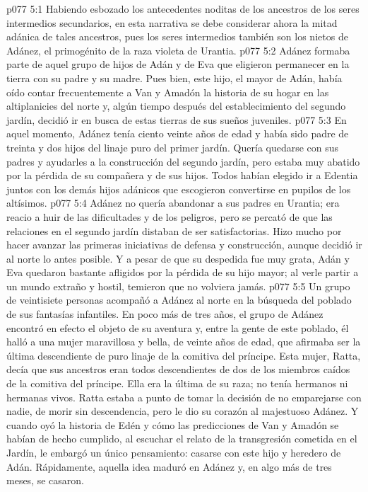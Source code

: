 \vs p077 5:1 Habiendo esbozado los antecedentes noditas de los ancestros de los seres intermedios secundarios, en esta narrativa se debe considerar ahora la mitad adánica de tales ancestros, pues los seres intermedios también son los nietos de Adánez, el primogénito de la raza violeta de Urantia.
\vs p077 5:2 \pc Adánez formaba parte de aquel grupo de hijos de Adán y de Eva que eligieron permanecer en la tierra con su padre y su madre. Pues bien, este hijo, el mayor de Adán, había oído contar frecuentemente a Van y Amadón la historia de su hogar en las altiplanicies del norte y, algún tiempo después del establecimiento del segundo jardín, decidió ir en busca de estas tierras de sus sueños juveniles.
\vs p077 5:3 En aquel momento, Adánez tenía ciento veinte años de edad y había sido padre de treinta y dos hijos del linaje puro del primer jardín. Quería quedarse con sus padres y ayudarles a la construcción del segundo jardín, pero estaba muy abatido por la pérdida de su compañera y de sus hijos. Todos habían elegido ir a Edentia juntos con los demás hijos adánicos que escogieron convertirse en pupilos de los altísimos.
\vs p077 5:4 Adánez no quería abandonar a sus padres en Urantia; era reacio a huir de las dificultades y de los peligros, pero se percató de que las relaciones en el segundo jardín distaban de ser satisfactorias. Hizo mucho por hacer avanzar las primeras iniciativas de defensa y construcción, aunque decidió ir al norte lo antes posible. Y a pesar de que su despedida fue muy grata, Adán y Eva quedaron bastante afligidos por la pérdida de su hijo mayor; al verle partir a un mundo extraño y hostil, temieron que no volviera jamás.
\vs p077 5:5 Un grupo de veintisiete personas acompañó a Adánez al norte en la búsqueda del poblado de sus fantasías infantiles. En poco más de tres años, el grupo de Adánez encontró en efecto el objeto de su aventura y, entre la gente de este poblado, él halló a una mujer maravillosa y bella, de veinte años de edad, que afirmaba ser la última descendiente de puro linaje de la comitiva del príncipe. Esta mujer, Ratta, decía que sus ancestros eran todos descendientes de dos de los miembros caídos de la comitiva del príncipe. Ella era la última de su raza; no tenía hermanos ni hermanas vivos. Ratta estaba a punto de tomar la decisión de no emparejarse con nadie, de morir sin descendencia, pero le dio su corazón al majestuoso Adánez. Y cuando oyó la historia de Edén y cómo las predicciones de Van y Amadón se habían de hecho cumplido, al escuchar el relato de la transgresión cometida en el Jardín, le embargó un único pensamiento: casarse con este hijo y heredero de Adán. Rápidamente, aquella idea maduró en Adánez y, en algo más de tres meses, se casaron.
